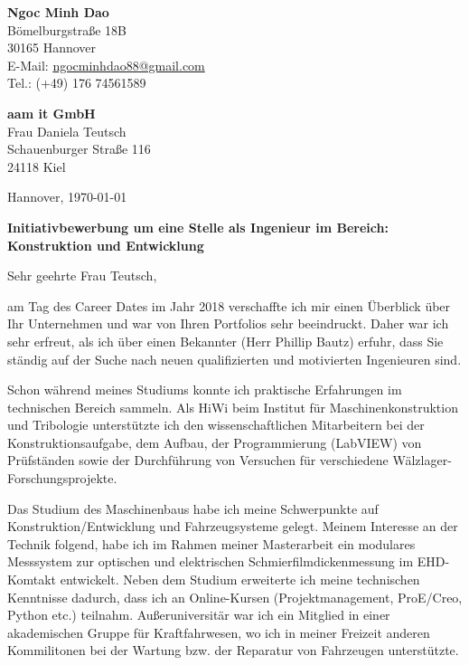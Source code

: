 \documentclass[11pt,a4paper]{letter}
\newcommand{\FirmaName}{aam it GmbH}
\newcommand{\FirmaAdresseLineOne}{Schauenburger Straße 116}
\newcommand{\FirmaAdresseLineTwo}{24118 Kiel}
\newcommand{\AnsprechpartnerVoll}{Frau Daniela Teutsch}
\newcommand{\Ansprechpartner}{Maier}
\newcommand{\Ansprechpartnerin}{Teutsch}
\begin{document}
\pagestyle{empty}

\begin{flushleft}
    \textbf{Ngoc Minh Dao}\\
    Bömelburgstraße 18B\\
    30165 Hannover\\
    E-Mail: \href{mailto:ngocminhdao88@gmail.com}{ngocminhdao88@gmail.com}\\
    Tel.: (+49) 176 74561589
\end{flushleft}

\begin{flushleft}
    \textbf{\FirmaName}\\
    \AnsprechpartnerVoll\\
    \FirmaAdresseLineOne\\
    \FirmaAdresseLineTwo\\
\end{flushleft}

\begin{flushright}
    Hannover, \today
\end{flushright}

\textbf{Initiativbewerbung um eine Stelle als Ingenieur im Bereich: Konstruktion und Entwicklung}\\
\vspace{1em}

Sehr geehrte Frau \Ansprechpartnerin,

am Tag des Career Dates im Jahr 2018 verschaffte ich mir einen Überblick über Ihr Unternehmen und war von Ihren Portfolios sehr beeindruckt.
Daher war ich sehr erfreut, als ich über einen Bekannter (Herr Phillip Bautz) erfuhr, dass Sie ständig auf der Suche nach neuen qualifizierten und motivierten Ingenieuren sind.

Schon während meines Studiums konnte ich praktische Erfahrungen im technischen Bereich sammeln.
Als HiWi beim Institut für Maschinenkonstruktion und Tribologie unterstützte ich den wissenschaftlichen Mitarbeitern bei der Konstruktionsaufgabe, dem Aufbau, der Programmierung (LabVIEW) von Prüfständen sowie der Durchführung von Versuchen für verschiedene Wälzlager-Forschungsprojekte.

Das Studium des Maschinenbaus habe ich meine Schwerpunkte auf Konstruktion/Entwicklung und Fahrzeugsysteme gelegt.
Meinem Interesse an der Technik folgend, habe ich im Rahmen meiner Masterarbeit ein modulares Messsystem zur optischen und elektrischen Schmierfilmdickenmessung im EHD-Komtakt entwickelt.
Neben dem Studium erweiterte ich meine technischen Kenntnisse dadurch, dass ich an Online-Kursen (Projektmanagement, ProE/Creo, Python etc.) teilnahm.
Außeruniversitär war ich ein Mitglied in einer akademischen Gruppe für Kraftfahrwesen, wo ich in meiner Freizeit anderen Kommilitonen bei der Wartung bzw. der Reparatur von Fahrzeugen unterstützte.
\end{document}
